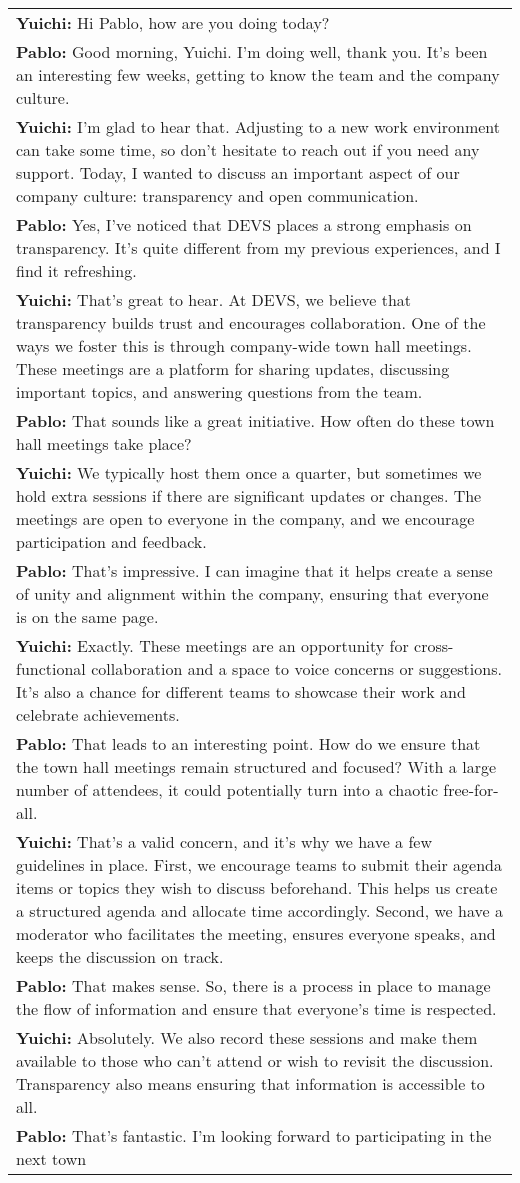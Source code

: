 \begin{xltabular}{0.9\linewidth}{X}
\textbf{Yuichi:} Hi Pablo, how are you doing today?\\ \textbf{Pablo:} Good morning, Yuichi. I'm doing well, thank you. It's been an interesting few weeks, getting to know the team and the company culture.\\ \textbf{Yuichi:} I'm glad to hear that. Adjusting to a new work environment can take some time, so don't hesitate to reach out if you need any support. Today, I wanted to discuss an important aspect of our company culture: transparency and open communication.\\ \textbf{Pablo:} Yes, I've noticed that DEVS places a strong emphasis on transparency. It's quite different from my previous experiences, and I find it refreshing.\\ \textbf{Yuichi:} That's great to hear. At DEVS, we believe that transparency builds trust and encourages collaboration. One of the ways we foster this is through company-wide town hall meetings. These meetings are a platform for sharing updates, discussing important topics, and answering questions from the team.\\ \textbf{Pablo:} That sounds like a great initiative. How often do these town hall meetings take place?\\ \textbf{Yuichi:} We typically host them once a quarter, but sometimes we hold extra sessions if there are significant updates or changes. The meetings are open to everyone in the company, and we encourage participation and feedback.\\ \textbf{Pablo:} That's impressive. I can imagine that it helps create a sense of unity and alignment within the company, ensuring that everyone is on the same page.\\ \textbf{Yuichi:} Exactly. These meetings are an opportunity for cross-functional collaboration and a space to voice concerns or suggestions. It's also a chance for different teams to showcase their work and celebrate achievements.\\ \textbf{Pablo:} That leads to an interesting point. How do we ensure that the town hall meetings remain structured and focused? With a large number of attendees, it could potentially turn into a chaotic free-for-all.\\ \textbf{Yuichi:} That's a valid concern, and it's why we have a few guidelines in place. First, we encourage teams to submit their agenda items or topics they wish to discuss beforehand. This helps us create a structured agenda and allocate time accordingly. Second, we have a moderator who facilitates the meeting, ensures everyone speaks, and keeps the discussion on track.\\ \textbf{Pablo:} That makes sense. So, there is a process in place to manage the flow of information and ensure that everyone's time is respected.\\ \textbf{Yuichi:} Absolutely. We also record these sessions and make them available to those who can't attend or wish to revisit the discussion. Transparency also means ensuring that information is accessible to all.\\ \textbf{Pablo:} That's fantastic. I'm looking forward to participating in the next town 
\end{xltabular}
